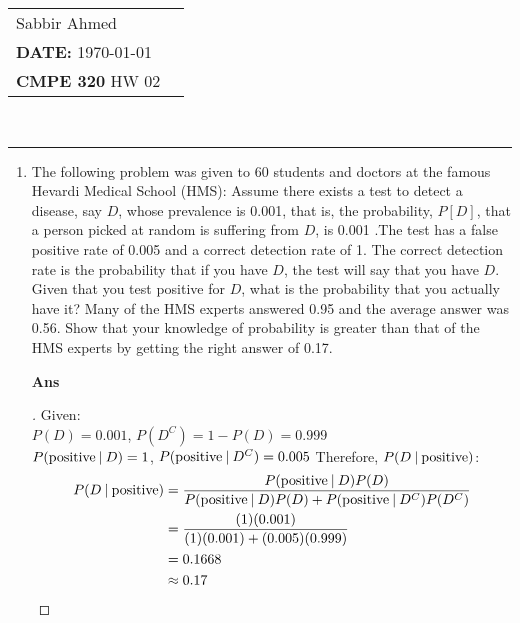 \documentclass[paper=usletter, fontsize=12pt]{article}
\newcommand{\documentinfo}[5]{
    \begin{centering}
        \parbox{2in}{
        \begin{spacing}{1}
            \begin{flushleft}
                \begin{tabular}{l l}
                    #1 \\
                    #2 \\
                    #3 \\
                \end{tabular}\\
                \rule{\textwidth}{1pt}
            \end{flushleft}
        \end{spacing}
        }
    \end{centering}
}
\begin{document}
    \documentinfo{Sabbir Ahmed}{\textbf{DATE:} \today}{\textbf{CMPE 320} HW 02}
    \vspace{-0.2in}

    \begin{enumerate}

        \item The following problem was given to 60 students and doctors at the
        famous Hevardi Medical School (HMS): Assume there exists a test to
        detect a disease, say $D$, whose prevalence is 0.001, that is, the
        probability, $P[D]$, that a person picked at random is suffering from
        $D$, is 0.001 .The test has a false positive rate of 0.005 and a
        correct detection rate of 1. The correct detection rate is the
        probability that if you have $D$, the test will say that you have $D$.
        Given that you test positive for $D$, what is the probability that you
        actually have it? Many of the HMS experts answered 0.95 and the average
        answer was 0.56. Show that your knowledge of probability is greater
        than that of the HMS experts by getting the right answer of 0.17.
        \item[\textbf{Ans}]
        \begin{proof}[\unskip\nopunct]
            Given: \\
            $P(D) = 0.001$, $P(D^C) = 1 - P(D) = 0.999$ \\
            $P(\text{positive} \:\vert\: D) = 1$, $P(\text{positive} \:\vert\: D^C) =
            0.005$
            Therefore, $P(D \:\vert\: \text{positive})$:
            \begin{align*}
                P(D \:\vert\: \text{positive}) & = \frac{P(\text{positive} \:\vert\: D)P(D)}{P(\text{positive} \:\vert\: D)P(D) + P(\text{positive} \:\vert\: D^C)P(D^C)} \\
                & = \frac{(1)(0.001)}{(1)(0.001) + (0.005)(0.999)} \\
                & = 0.1668 \\
                & \approx 0.17 \qedhere
            \end{align*}
        \end{proof}
        \vspace{0.2in}


\end{enumerate}
\end{document}
